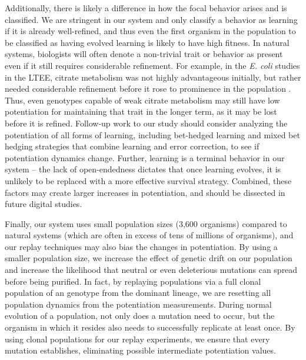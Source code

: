 Additionally, there is likely a difference in how the focal behavior arises and is classified. 
We are stringent in our system and only classify a behavior as learning if it is already well-refined, and thus even the first organism in the population to be classified as having evolved learning is likely to have high fitness. 
In natural systems, biologists will often denote a non-trivial trait or behavior as present even if it still requires considerable refinement. 
For example, in the \textit{E. coli} studies in the LTEE, citrate metabolism was not highly advantageous initially, but rather needed considerable refinement before it rose to prominence in the population \citep{blountGenomicAnalysisKey2012}.
Thus, even genotypes capable of weak citrate metabolism may still have low potentiation for maintaining that trait in the longer term, as it may be lost before it is refined. 
Follow-up work to our study should consider analyzing the potentiation of all forms of learning, including bet-hedged learning and mixed bet hedging strategies that combine learning and error correction, to see if potentiation dynamics change. 
Further, learning is a terminal behavior in our system -- the lack of open-endedness dictates that once learning evolves, it is unlikely to be replaced with a more effective survival strategy. 
Combined, these factors may create larger increases in potentiation, and should be dissected in future digital studies. 

Finally, our system uses small population sizes (3,600 organisms) compared to natural systems (which are often in excess of tens of millions of organisms), and our replay techniques may also bias the changes in potentiation. 
By using a smaller population size, we increase the effect of genetic drift on our population and increase the likelihood that neutral or even deleterious mutations can spread before being purified. 
In fact, by replaying populations via a full clonal population of an genotype from the dominant lineage, we are resetting all population dynamics from the potentiation measurements. 
During normal evolution of a population, not only does a mutation need to occur, but the organism in which it resides also needs to successfully replicate at least once. 
By using clonal populations for our replay experiments, we ensure that every mutation establishes, eliminating possible intermediate potentiation values. 

